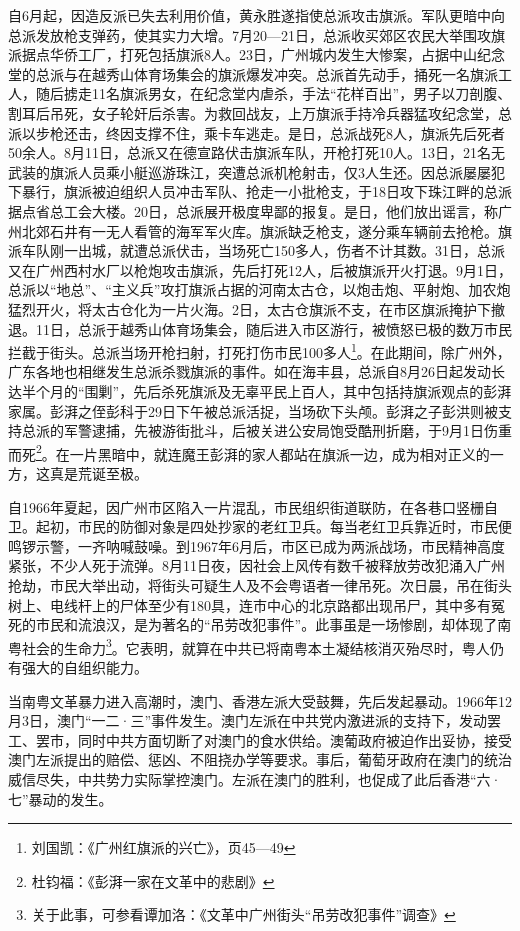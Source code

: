 自6月起，因造反派已失去利用价值，黄永胜遂指使总派攻击旗派。军队更暗中向总派发放枪支弹药，使其实力大增。7月20—21日，总派收买郊区农民大举围攻旗派据点华侨工厂，打死包括旗派8人。23日，广州城内发生大惨案，占据中山纪念堂的总派与在越秀山体育场集会的旗派爆发冲突。总派首先动手，捅死一名旗派工人，随后掳走11名旗派男女，在纪念堂内虐杀，手法“花样百出”，男子以刀剖腹、割耳后吊死，女子轮奸后杀害。为救回战友，上万旗派手持冷兵器猛攻纪念堂，总派以步枪还击，终因支撑不住，乘卡车逃走。是日，总派战死8人，旗派先后死者50余人。8月11日，总派又在德宣路伏击旗派车队，开枪打死10人。13日，21名无武装的旗派人员乘小艇巡游珠江，突遭总派机枪射击，仅3人生还。因总派屡屡犯下暴行，旗派被迫组织人员冲击军队、抢走一小批枪支，于18日攻下珠江畔的总派据点省总工会大楼。20日，总派展开极度卑鄙的报复。是日，他们放出谣言，称广州北郊石井有一无人看管的海军军火库。旗派缺乏枪支，遂分乘车辆前去抢枪。旗派车队刚一出城，就遭总派伏击，当场死亡150多人，伤者不计其数。31日，总派又在广州西村水厂以枪炮攻击旗派，先后打死12人，后被旗派开火打退。9月1日，总派以“地总”、“主义兵”攻打旗派占据的河南太古仓，以炮击炮、平射炮、加农炮猛烈开火，将太古仓化为一片火海。2日，太古仓旗派不支，在市区旗派掩护下撤退。11日，总派于越秀山体育场集会，随后进入市区游行，被愤怒已极的数万市民拦截于街头。总派当场开枪扫射，打死打伤市民100多人\footnote{刘国凯：《广州红旗派的兴亡》，页45—49}。在此期间，除广州外，广东各地也相继发生总派杀戮旗派的事件。如在海丰县，总派自8月26日起发动长达半个月的“围剿”，先后杀死旗派及无辜平民上百人，其中包括持旗派观点的彭湃家属。彭湃之侄彭科于29日下午被总派活捉，当场砍下头颅。彭湃之子彭洪则被支持总派的军警逮捕，先被游街批斗，后被关进公安局饱受酷刑折磨，于9月1日伤重而死\footnote{杜钧福：《彭湃一家在文革中的悲剧》}。在一片黑暗中，就连魔王彭湃的家人都站在旗派一边，成为相对正义的一方，这真是荒诞至极。

自1966年夏起，因广州市区陷入一片混乱，市民组织街道联防，在各巷口竖栅自卫。起初，市民的防御对象是四处抄家的老红卫兵。每当老红卫兵靠近时，市民便鸣锣示警，一齐呐喊鼓噪。到1967年6月后，市区已成为两派战场，市民精神高度紧张，不少人死于流弹。8月11日夜，因社会上风传有数千被释放劳改犯涌入广州抢劫，市民大举出动，将街头可疑生人及不会粤语者一律吊死。次日晨，吊在街头树上、电线杆上的尸体至少有180具，连市中心的北京路都出现吊尸，其中多有冤死的市民和流浪汉，是为著名的“吊劳改犯事件”。此事虽是一场惨剧，却体现了南粤社会的生命力\footnote{关于此事，可参看谭加洛：《文革中广州街头“吊劳改犯事件”调查》}。它表明，就算在中共已将南粤本土凝结核消灭殆尽时，粤人仍有强大的自组织能力。

当南粤文革暴力进入高潮时，澳门、香港左派大受鼓舞，先后发起暴动。1966年12月3日，澳门“一二·三”事件发生。澳门左派在中共党内激进派的支持下，发动罢工、罢市，同时中共方面切断了对澳门的食水供给。澳葡政府被迫作出妥协，接受澳门左派提出的赔偿、惩凶、不阻挠办学等要求。事后，葡萄牙政府在澳门的统治威信尽失，中共势力实际掌控澳门。左派在澳门的胜利，也促成了此后香港“六·七”暴动的发生。

